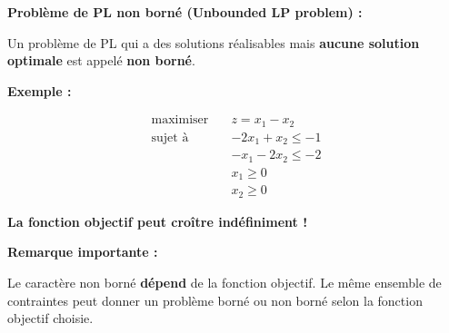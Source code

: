 \documentclass[12pt,a4paper]{article}
\begin{document}
\begin{definition}
\textbf{Problème de PL non borné (Unbounded LP problem) :}

Un problème de PL qui a des solutions réalisables mais \textcolor{importantrouge}{\textbf{aucune solution optimale}} est appelé \textcolor{importantrouge}{\textbf{non borné}}.
\end{definition}

\begin{exemple}
\textbf{Exemple :}

\begin{align*}
\text{maximiser} \quad & z = x_1 - x_2\\
\text{sujet à} \quad & -2x_1 + x_2 \leq -1\\
& -x_1 - 2x_2 \leq -2\\
& x_1 \geq 0\\
& x_2 \geq 0
\end{align*}

\begin{center}
\end{center}

\textcolor{importantrouge}{\textbf{La fonction objectif peut croître indéfiniment !}}
\end{exemple}

\begin{important}
\textbf{Remarque importante :}

Le caractère non borné \textcolor{importantrouge}{\textbf{dépend}} de la fonction objectif. Le même ensemble de contraintes peut donner un problème borné ou non borné selon la fonction objectif choisie.
\end{important}
\end{document}
